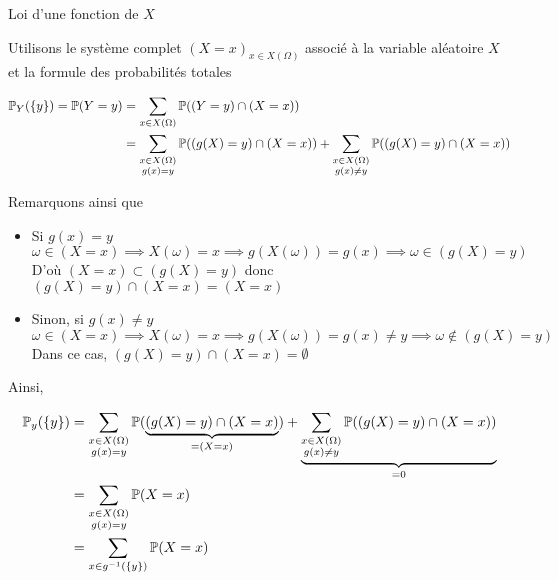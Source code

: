 \documentclass{article}
\begin{document}
\begin{question_kholle}[{
	Soit $X$ une variable alétoire sur $\Omega$ et $g$ une fonction définie sur $X(\Omega)$.
	La loi de probabilité $Y = g(X)$ est donnée par $Y(\Omega) = g(X(\Omega))$ et
	\begin{equation}
		\forall y \in Y(\Omega), \proba_{Y}(\{ y \})= \proba(Y=y) = \sum_{x \in g^{-1}(\{ y \})}\proba(X=x)= \sum_{\substack{x \in X(\Omega)\\ g(x)=y}}\proba(X=x)
	\end{equation}
	}]{Loi d'une fonction de $X$}
	
	Utilisons le système complet $(X = x)_{x \in X(\Omega)}$ associé à la variable aléatoire $X$ et la formule des probabilités totales
	
	\begin{align*}
		\mathbb P_{Y}(\{ y \}) = \mathbb P(Y=y) &= \sum_{x \in X(\Omega)}\mathbb P((Y=y) \cap (X=x)) \\
		&= \sum_{\substack{x \in X(\Omega)\\ g(x)=y}}\mathbb P((g(X)=y) \cap (X=x)) + \sum_{\substack{x \in X(\Omega)\\ g(x)\neq y}}\mathbb P((g(X)=y) \cap (X=x))
	\end{align*}
	
	
	Remarquons ainsi que
	\begin{itemize}[label=$\star$]
		\item Si $g(x) = y$
		$$
		\omega \in(X=x) \implies X(\omega)=x \implies g(X(\omega)) = g(x) \implies \omega \in (g(X) = y)
		$$
		D'où $(X = x) \subset (g(X)=y)$ donc $(g(X) = y) \cap(X=x)=(X=x)$
		
		\item Sinon, si $g(x) \neq y$
		$$
		\omega \in (X=x) \implies X(\omega) = x \implies g(X(\omega)) = g(x) \neq y \implies \omega \not\in (g(X) = y)
		$$
		Dans ce cas, $(g(X) = y) \cap (X = x) = \emptyset$
		
	\end{itemize}
	Ainsi, 
	
	\begin{align*}
		\mathbb P_{y}(\{ y \}) &= \sum_{\substack{x \in X(\Omega)\\ g(x)=y}}\mathbb P(\underbrace{ (g(X)=y) \cap (X=x) }_{ = (X=x) }) + \underbrace{ \sum_{\substack{x \in X(\Omega)\\ g(x)\neq y}}\mathbb P((g(X)=y) \cap (X=x)) }_{ =0 }\\
		&= \sum_{\substack{x \in X(\Omega)\\ g(x)=y}}\mathbb P(X=x) \\
		&= \sum_{x \in g^{-1}(\{ y \})}\mathbb P(X=x)
	\end{align*}
	
	
\end{question_kholle}
\end{document}

